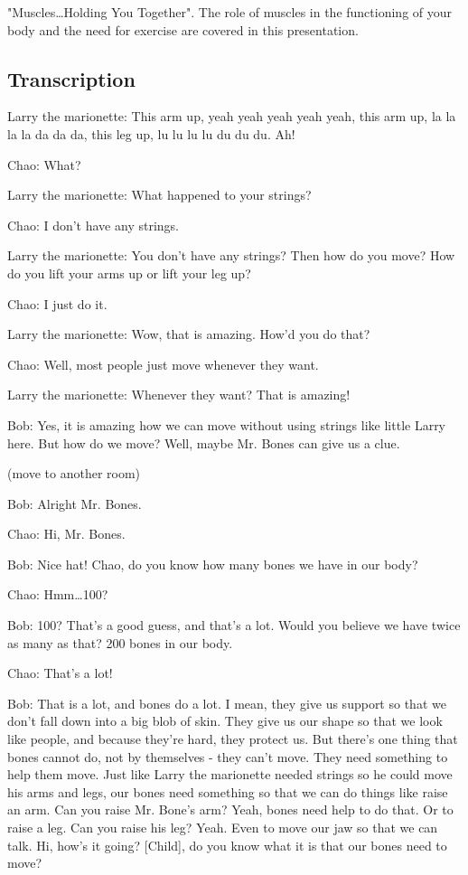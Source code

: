 "Muscles\dots Holding You Together". The role of muscles in the functioning of your body and the need for exercise are covered in this presentation.

\subsection{Transcription}

Larry the marionette: This arm up, yeah yeah yeah yeah yeah, this arm up, la la la la da da da, this leg up, lu lu lu lu du du du. Ah!

Chao: What?

Larry the marionette: What happened to your strings?

Chao: I don't have any strings.

Larry the marionette: You don't have any strings? Then how do you move? How do you lift your arms up or lift your leg up?

Chao: I just do it.

Larry the marionette: Wow, that is amazing. How'd you do that?

Chao: Well, most people just move whenever they want.

Larry the marionette: Whenever they want? That is amazing!

Bob: Yes, it is amazing how we can move without using strings like little Larry here. But how do we move? Well, maybe Mr. Bones can give us a clue.

(move to another room)

Bob: Alright Mr. Bones.

Chao: Hi, Mr. Bones.

Bob: Nice hat! Chao, do you know how many bones we have in our body?

Chao: Hmm\dots 100?

Bob: 100? That's a good guess, and that's a lot. Would you believe we have twice as many as that? 200 bones in our body.

Chao: That's a lot!

Bob: That is a lot, and bones do a lot. I mean, they give us support so that we don't fall down into a big blob of skin. They give us our shape so that we look like people, and because they're hard, they protect us. But there's one thing that bones cannot do, not by themselves - they can't move. They need something to help them move. Just like Larry the marionette needed strings so he could move his arms and legs, our bones need something so that we can do things like raise an arm. Can you raise Mr. Bone's arm? Yeah, bones need help to do that. Or to raise a leg. Can you raise his leg? Yeah. Even to move our jaw so that we can talk. Hi, how's it going? [Child], do you know what it is that our bones need to move?


